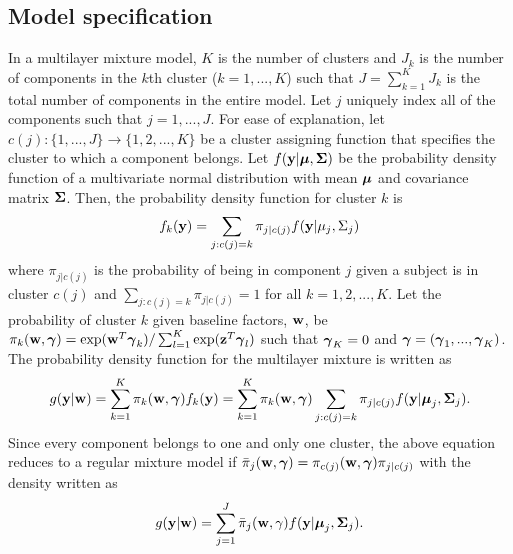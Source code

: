 \subsection{Model specification}
In a multilayer mixture model, $K$ is the number of clusters and $J_{k}$ is the number of components in the $k$th cluster ($k=1,...,K$) such that $J=\sum_{k=1}^{K}J_{k}$ is the total number of components in the entire model. Let $j$ uniquely index all of the components such that $j=1,...,J$. For ease of explanation, let $c(j):\{1,...,J\}\rightarrow \{1,2,...,K\}$ be a cluster assigning function that specifies the cluster to which a component belongs. Let $f(\mathbf y|\boldsymbol\mu,\boldsymbol\Sigma)$ be the probability density function of a multivariate normal distribution with mean $\boldsymbol\mu$ and covariance matrix $\boldsymbol\Sigma$. Then, the probability density function for cluster $k$ is
$$f_{k}(\mathbf y) = \sum_{j: c(j) = k} \pi_{j|c(j)}f(\mathbf y|\mu_{j},\Sigma_{j})$$
where $\pi_{j|c(j)}$ is the probability of being in component $j$ given a subject is in cluster $c(j)$ and $\sum_{j: c(j) = k}\pi_{j|c(j)}=1$ for all $k=1,2,...,K$. Let the probability of cluster $k$ given baseline factors, $\mathbf w$, be $\pi_{k}(\mathbf w,\boldsymbol\gamma)=\exp(\mathbf w^{T}\boldsymbol\gamma_{k})/\sum^{K}_{l=1}\exp(\mathbf z^{T}\boldsymbol\gamma_{l})$ such that $\boldsymbol\gamma_{K}=0$ and $\boldsymbol\gamma=(\boldsymbol\gamma_{1},...,\boldsymbol\gamma_{K})$. The probability density function for the multilayer mixture is written as
$$g(\mathbf y|\mathbf w) = \sum_{k=1}^{K}\pi_{k}(\mathbf w,\boldsymbol \gamma)f_{k}(\mathbf y) = \sum_{k=1}^{K}\pi_{k}(\mathbf w,\boldsymbol\gamma)\sum_{j: c(j) = k} \pi_{j|c(j)}f( \mathbf y| \boldsymbol\mu_{j},\boldsymbol\Sigma_{j}).$$
Since every component belongs to one and only one cluster, the above equation reduces to a regular mixture model if $\bar{\pi}_{j}(\mathbf w,\boldsymbol \gamma)=\pi_{c(j)}(\mathbf w,\boldsymbol\gamma)\pi_{j|c(j)}$ with the density written as
$$g(\mathbf y|\mathbf w) = \sum_{j=1}^{J}\bar{\pi}_{j}(\mathbf w,\gamma)f(\mathbf y|\boldsymbol \mu_{j},\boldsymbol\Sigma_{j}).$$

